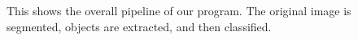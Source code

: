 \documentclass[12pt]{article}
\begin{document}
\begin{figure}
	\centering
	\hfill
	\caption{This shows the overall pipeline of our program. The original image is segmented, objects are extracted, and then classified.}
	\label{fig:pipeline}
\end{figure}
\end{document}
